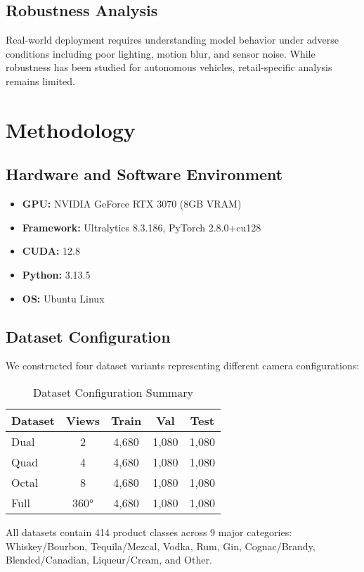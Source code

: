 \documentclass[conference]{IEEEtran}
\begin{document}
\subsection{Robustness Analysis}
Real-world deployment requires understanding model behavior under adverse conditions including poor lighting, motion blur, and sensor noise. While robustness has been studied for autonomous vehicles, retail-specific analysis remains limited.

\section{Methodology}

\subsection{Hardware and Software Environment}
\begin{itemize}
    \item \textbf{GPU:} NVIDIA GeForce RTX 3070 (8GB VRAM)
    \item \textbf{Framework:} Ultralytics 8.3.186, PyTorch 2.8.0+cu128
    \item \textbf{CUDA:} 12.8
    \item \textbf{Python:} 3.13.5
    \item \textbf{OS:} Ubuntu Linux
\end{itemize}

\subsection{Dataset Configuration}
We constructed four dataset variants representing different camera configurations:

\begin{table}[h]
\centering
\caption{Dataset Configuration Summary}
\begin{tabular}{lcccc}
\toprule
\textbf{Dataset} & \textbf{Views} & \textbf{Train} & \textbf{Val} & \textbf{Test} \\
\midrule
Dual & 2 & 4,680 & 1,080 & 1,080 \\
Quad & 4 & 4,680 & 1,080 & 1,080 \\
Octal & 8 & 4,680 & 1,080 & 1,080 \\
Full & 360° & 4,680 & 1,080 & 1,080 \\
\bottomrule
\end{tabular}
\end{table}

All datasets contain 414 product classes across 9 major categories: Whiskey/Bourbon, Tequila/Mezcal, Vodka, Rum, Gin, Cognac/Brandy, Blended/Canadian, Liqueur/Cream, and Other.
\end{document}
